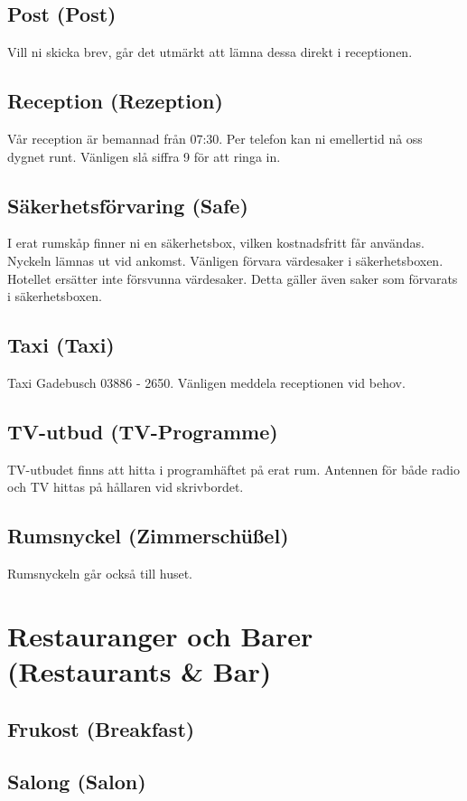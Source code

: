 \documentclass{report}
\begin{document}
\section{Post (Post)}
Vill ni skicka brev, går det utmärkt att lämna dessa direkt i receptionen.

\section{Reception (Rezeption)}
Vår reception är bemannad från 07:30. Per telefon kan ni emellertid nå oss dygnet runt. Vänligen slå siffra 9 för
att ringa in.
\section{Säkerhetsförvaring (Safe)}
I erat rumskåp finner ni en säkerhetsbox, vilken kostnadsfritt får användas.
Nyckeln lämnas ut vid ankomst.  Vänligen förvara värdesaker i säkerhetsboxen.
Hotellet ersätter inte försvunna värdesaker. Detta gäller även saker som
förvarats i säkerhetsboxen.

\section{Taxi (Taxi)}
Taxi Gadebusch 03886 - 2650. Vänligen meddela receptionen vid behov.

\section{TV-utbud (TV-Programme)}
TV-utbudet finns att hitta i programhäftet på erat rum. Antennen för både radio
och TV hittas på hållaren vid skrivbordet.

\section{Rumsnyckel (Zimmerschüßel)}
Rumsnyckeln går också till huset.

\chapter{Restauranger och Barer (Restaurants \& Bar)}

\section{Frukost (Breakfast)}

\section{Salong (Salon)}
\end{document}

